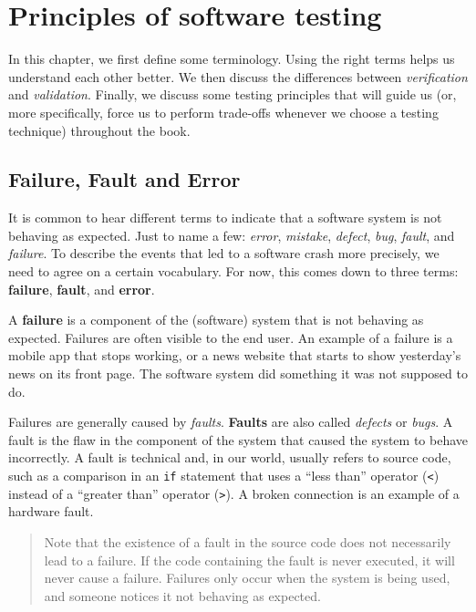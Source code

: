 \hypertarget{principles-of-software-testing}{%
\section{Principles of software
testing}\label{principles-of-software-testing}}

In this chapter, we first define some terminology. Using the right terms
helps us understand each other better. We then discuss the differences
between \emph{verification} and \emph{validation}. Finally, we discuss
some testing principles that will guide us (or, more specifically, force
us to perform trade-offs whenever we choose a testing technique)
throughout the book.

\hypertarget{failure-fault-and-error}{%
\subsection{Failure, Fault and Error}\label{failure-fault-and-error}}

It is common to hear different terms to indicate that a software system
is not behaving as expected. Just to name a few: \emph{error},
\emph{mistake}, \emph{defect}, \emph{bug}, \emph{fault}, and
\emph{failure}. To describe the events that led to a software crash more
precisely, we need to agree on a certain vocabulary. For now, this comes
down to three terms: \textbf{failure}, \textbf{fault}, and
\textbf{error}.

A \textbf{failure} is a component of the (software) system that is not
behaving as expected. Failures are often visible to the end user. An
example of a failure is a mobile app that stops working, or a news
website that starts to show yesterday's news on its front page. The
software system did something it was not supposed to do.

Failures are generally caused by \emph{faults}. \textbf{Faults} are also
called \emph{defects} or \emph{bugs}. A fault is the flaw in the
component of the system that caused the system to behave incorrectly. A
fault is technical and, in our world, usually refers to source code,
such as a comparison in an \texttt{if} statement that uses a ``less
than'' operator (\texttt{\textless{}}) instead of a ``greater than''
operator (\texttt{\textgreater{}}). A broken connection is an example of
a hardware fault.

\begin{quote}
Note that the existence of a fault in the source code does not
necessarily lead to a failure. If the code containing the fault is never
executed, it will never cause a failure. Failures only occur when the
system is being used, and someone notices it not behaving as expected.
\end{quote}

